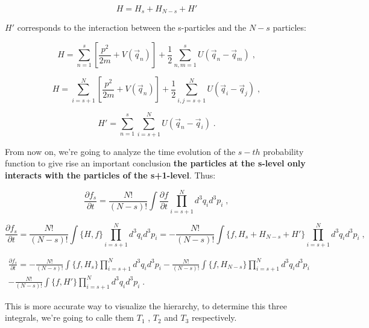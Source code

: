 \documentclass[spanish,notitlepage,letterpaper,11pt]{article} %
\numberwithin{equation}{subsection}
\begin{document}
        \begin{equation}
            H = H_s + H_{N-s} + H'
        \end{equation}

        $H'$ corresponds to the interaction between the s-particles and the $N-s$ particles:

        \begin{equation}
            H = \sum_{n=1}^s \left[\frac{p^2}{2m} + V(\Vec{q}_n) \right] + \frac{1}{2}\sum_{n,m = 1}^s U(\Vec{q}_n - \Vec{q}_m)\;,
        \end{equation}

        \begin{equation}
            H = \sum_{i = s+1}^N \left[\frac{p^2}{2m} + V(\Vec{q}_n) \right] + \frac{1}{2}\sum_{i,j = s+1}^N U(\Vec{q}_i - \Vec{q}_j)\;,
        \end{equation}

        \begin{equation}
            H' = \sum_{n=1}^s\sum_{i = s+1}^N U(\Vec{q}_n - \Vec{q}_i)\;.
        \end{equation}

    From now on, we're going to analyze the time evolution of the $s-th$ probability function to give rise an important conclusion \textbf{the particles at the s-level only interacts with the particles of the s+1-level}. Thus:

    \begin{equation}
        \frac{\partial f_s}{\partial t} = \frac{N!}{(N-s)!}\int\frac{\partial f}{\partial t}\prod_{i = s+1}^Nd^3q_id^3p_i\;,
    \end{equation}

    \begin{equation*}
        \frac{\partial f_s}{\partial t} = \frac{N!}{(N-s)!}\int\{H,f\}\prod_{i = s+1}^N d^3q_id^3p_i = - \frac{N!}{(N-s)!}\int \{f,H_s + H_{N-s} + H'\}\prod_{i = s+1}^Nd^3q_id^3p_i\;,
    \end{equation*}

    \begin{align}
        \frac{\partial f_s}{\partial t} = -\frac{N!}{(N-s)!}\int\{f,H_s\}\prod_{i=s+1}^Nd^3q_id^3p_i - \frac{N!}{(N-s)!}\int\{f,H_{N-s}\}\prod_{i=s+1}^Nd^3q_id^3p_i \\
        - \frac{N!}{(N-s)!}\int\{f,H'\}\prod_{i=s+1}^Nd^3q_id^3p_i\;.
    \end{align}

    This is more accurate way to visualize the hierarchy, to determine this three integrals, we're going to calle them $T_1$ , $T_2$ and $T_3$ respectively.
\end{document}
